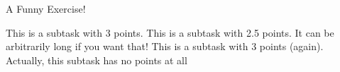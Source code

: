\begin{Exercise}{A Funny Exercise!}
\begin{tasks}
    This is a subtask with 3 points.
    This is a subtask with 2.5 points. It can be arbitrarily long if you want that!
   \newpage
    This is a subtask with 3 points (again).
    Actually, this subtask has no points at all
\end{tasks}
\end{Exercise}